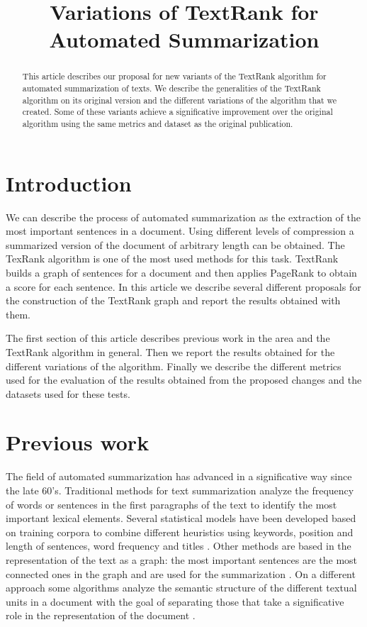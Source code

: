 \documentclass{llncs}
\begin{document}
\frontmatter

\title{Variations of TextRank for Automated Summarization}


\maketitle

\begin{abstract}
This article describes our proposal for new variants of the TextRank algorithm for automated summarization of texts. We describe the generalities of the TextRank algorithm on its original version and the different variations of the algorithm that we created. Some of these variants achieve a significative improvement over the original algorithm using the same metrics and dataset as the original publication. 

\end{abstract}

\section{Introduction}
We can describe the process of automated summarization as the extraction of the most important sentences in a document. Using different levels of compression a summarized version of the document of arbitrary length can be obtained. The TexRank algorithm is one of the most used methods for this task. TextRank builds a graph of sentences for a document and then applies PageRank to obtain a score for each sentence. In this article we describe several different proposals for the construction of the TextRank graph and report the results obtained with them.

The first section of this article describes previous work in the area and the TextRank algorithm in general. Then we report the results obtained for the different variations of the algorithm. Finally we describe the different metrics used for the evaluation of the results obtained from the proposed changes and the datasets used for these tests.

\section{Previous work}
The field of automated summarization has advanced in a significative way since the late 60's. Traditional methods for text summarization analyze the frequency of words or sentences in the first paragraphs of the text to identify the most important lexical elements. Several statistical models have been developed based on training corpora to combine different heuristics using keywords, position and length of sentences, word frequency and titles \cite{hovy}. Other methods are based in the representation of the text as a graph: the most important sentences are the most connected ones in the graph and are used for the summarization \cite{barzilay}. On a different approach some algorithms analyze the semantic structure of the different textual units in a document with the goal of separating those that take a significative role in the representation of the document \cite{marcu}.
\end{document}
